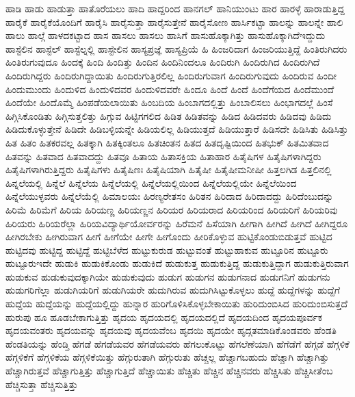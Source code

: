 {ಹಾಡಿ
ಹಾಡು
ಹಾಡುತ್ತಾ
ಹಾತೊರೆಯಲು
ಹಾದಿ
ಹಾದ್ದರಿಂದ
ಹಾನಗಲ್
ಹಾನಿಯುಂಟು
ಹಾರ
ಹಾರಳ್ಳೆ
ಹಾರಾಡುತ್ತಿದ್ದ
ಹಾರೈಕೆ
ಹಾರೈಕೆಯೊಂದಿಗೆ
ಹಾರೈಸಿ
ಹಾರೈಸುತ್ತಾ
ಹಾರೈಸುತ್ತೇನೆ
ಹಾರೈಸೋಣ
ಹಾರ್ಸಿಕಟ್ಟಾ
ಹಾಲನ್ನು
ಹಾಲನ್ನೇ
ಹಾಲಿ
ಹಾಲು
ಹಾಲ್ಗೆ
ಹಾಳದಕಟ್ಟಾದ
ಹಾಸ
ಹಾಸಲು
ಹಾಸಲು
ಹಾಸಿಗೆ
ಹಾಸುಹೊಕ್ಕಾಗಿತ್ತು
ಹಾಸುಹೊಕ್ಕಾಗಿದೆಇದ್ದುದು
ಹಾಸ್ಟೆಲಿನ
ಹಾಸ್ಟೆಲ್
ಹಾಸ್ಟೆಲ್ನಲ್ಲಿ
ಹಾಸ್ಟೇಲಿನ
ಹಾಸ್ಯಪ್ರಜ್ಞೆ
ಹಾಸ್ಯಪ್ರಿಯೆ
ಹಿ
ಹಿಂಜರಿದಾಗ
ಹಿಂಜರಿಯುತ್ತಿದ್ದೆ
ಹಿಂತಿರುಗಿದರು
ಹಿಂತಿರುಗುವುದೂ
ಹಿಂದಕ್ಕೆ
ಹಿಂದಿ
ಹಿಂದಿತ್ತು
ಹಿಂದಿನ
ಹಿಂದಿನಿಂದಲೂ
ಹಿಂದಿರುಗಿ
ಹಿಂದಿರುಗಿದ
ಹಿಂದಿರುಗಿದೆ
ಹಿಂದಿರುಗಿದ್ದರು
ಹಿಂದಿರುಗಿದ್ದಾಯಿತು
ಹಿಂದಿರುಗುತ್ತಿರಲಿಲ್ಲ
ಹಿಂದಿರುಗುವಾಗ
ಹಿಂದಿರುಗುವುದು
ಹಿಂದಿರುವ
ಹಿಂದೀ
ಹಿಂದುಮುಂದು
ಹಿಂದುಳಿದ
ಹಿಂದುಳಿದವರ
ಹಿಂದುಳಿದವರೇ
ಹಿಂದೂ
ಹಿಂದೆ
ಹಿಂದೆ
ಹಿಂದೆಗೆಯದ
ಹಿಂದೆಮುಂದೆ
ಹಿಂದೆಯೇ
ಹಿಂದೊಮ್ಮೆ
ಹಿಂಪಡೆಯಲಾಯಿತು
ಹಿಂಬದಿಯ
ಹಿಂಬಾಗದಲ್ಲಿತ್ತು
ಹಿಂಬಾಲಿಸಲು
ಹಿಂಭಾಗದಲ್ಲೆ
ಹಿಂಸೆ
ಹಿಗ್ಗಿಸಿಕೊಂಡಿತು
ಹಿಗ್ಗಿಸುತ್ತಲಿತ್ತು
ಹಿಗ್ಗುವ
ಹಿಟ್ಟಿಗಗಲಿದ
ಹಿಡಿತ
ಹಿಡಿತವನ್ನು
ಹಿಡಿದ
ಹಿಡಿದವರು
ಹಿಡಿದವು
ಹಿಡಿದು
ಹಿಡಿದುಕೊಳ್ಳುತ್ತೇನೆ
ಹಿಡಿದೇ
ಹಿಡಿಬಳ್ಳಿಯನ್ನೇ
ಹಿಡಿಯಲಿಲ್ಲ
ಹಿಡಿಯುತ್ತದೆ
ಹಿಡಿಯುತ್ತಾರೆ
ಹಿಡಿಸದೇ
ಹಿಡಿಸಿತು
ಹಿಡಿಸಿತ್ತು
ಹಿತ
ಹಿತಂ
ಹಿತಕರವಲ್ಲ
ಹಿತಕ್ಕಾಗಿ
ಹಿತಕ್ಕಿಂತಲೂ
ಹಿತಚಿಂತನ
ಹಿತದ
ಹಿತದೃಷ್ಟಿಯಿಂದ
ಹಿತಭುಕ್
ಹಿತಮಿತವಾದ
ಹಿತವನ್ನು
ಹಿತವಾದ
ಹಿತವಾದದ್ದು
ಹಿತವೂ
ಹಿತಾಯ
ಹಿತಾಸಕ್ತಿಯ
ಹಿತಾಹಾರ
ಹಿತೈಷಿಗಳ
ಹಿತೈಷಿಗಳಾಗಿದ್ದರು
ಹಿತೈಷಿಗಳಾಗಿರುತ್ತಿದ್ದರು
ಹಿತೈಷಿಗಳು
ಹಿತೈಷಿಣಃ
ಹಿತೈಷಿಯಾಗಿ
ಹಿತೈಷೀ
ಹಿತೈಷೀಮನೀಷೀ
ಹಿತ್ತಲಗಿಡ
ಹಿತ್ತಲಿನಲ್ಲಿ
ಹಿನ್ನಲೆಯಲ್ಲಿ
ಹಿನ್ನೆಲೆ
ಹಿನ್ನೆಲೆಯ
ಹಿನ್ನೆಲೆಯಲ್ಲಿ
ಹಿನ್ನೆಲೆಯಲ್ಲಿಯಿಂದ
ಹಿನ್ನೆಲೆಯಲ್ಲಿಯೇ
ಹಿನ್ನೆಲೆಯಿಂದ
ಹಿನ್ನೆಲೆಯುಳ್ಳವರು
ಹಿನ್ನೆಲೆಯೆಲ್ಲಿ
ಹಿಮಾಲಯಃ
ಹಿರಣ್ಯರೇತಸಂ
ಹಿರಿತನ
ಹಿರಿದಾದ
ಹಿರಿದಾದದ್ದು
ಹಿರಿದೆಂಬುದನ್ನು
ಹಿರಿಮೆ
ಹಿರಿಮೆಗೆ
ಹಿರಿಯ
ಹಿರಿಯಣ್ಣ
ಹಿರಿಯಣ್ಣನ
ಹಿರಿಯರ
ಹಿರಿಯರಾದ
ಹಿರಿಯರಿಂದ
ಹಿರಿಯರಿಗೆ
ಹಿರಿಯರಿವು
ಹಿರಿಯರು
ಹಿರಿಯರೆಲ್ಲಾ
ಹಿರಿಯವಿದ್ಯಾರ್ಥಿಯೋರ್ವರನ್ನು
ಹಿರೆಮನೆ
ಹಿಸೆಯಾಗಿ
ಹೀಗಾಗಿ
ಹೀಗಿದೆ
ಹೀಗಿದೆ
ಹೀಗಿದ್ದರೂ
ಹೀಗಿರಬೇಕು
ಹೀಗಿರುವಾಗ
ಹೀಗೆ
ಹೀಗೆಯೇ
ಹೀಗೇ
ಹೀಗೊಂದು
ಹೀರಿಕೊಳ್ಳುವ
ಹುಟ್ಟಿಕೊಂಡುಬಿಡುತ್ತವೆ
ಹುಟ್ಟಿದ
ಹುಟ್ಟಿದವು
ಹುಟ್ಟಿದ್ದ
ಹುಟ್ಟಿದ್ದೆ
ಹುಟ್ಟಿಬೆಳೆದ
ಹುಟ್ಟುಕುರುಡ
ಹುಟ್ಟುವಂತೆ
ಹುಟ್ಟುಹಾಕುವ
ಹುಟ್ಟೂರಿನ
ಹುಟ್ಟೂರು
ಹುಟ್ಟೂರುಇದೇ
ಹುಡುಕಿ
ಹುಡುಕಿಕೊಂಡು
ಹುಡುಕಿದೆ
ಹುಡುಕುತ್ತ
ಹುಡುಕುತ್ತಿದ್ದ
ಹುಡುಕುತ್ತಿದ್ದಾಗ
ಹುಡುಕುತ್ತಿರುವಾಗ
ಹುಡುಕುವ
ಹುಡುಕುವುದಕ್ಕಾಗಿಯೇ
ಹುಡುಕುವುದು
ಹುಡುಗ
ಹುಡುಗನ
ಹುಡುಗನಾದ
ಹುಡುಗನಿಗೆ
ಹುಡುಗನು
ಹುಡುಗರಿಗೆಲ್ಲಾ
ಹುಡುಗಿಯರಿಗೆ
ಹುಡುಗಿಯರೇ
ಹುದುಗಿರುವ
ಹುದುಗಿಸಿಟ್ಟುಕೊಳ್ಳಲು
ಹುದ್ದೆ
ಹುದ್ದೆಗಳನ್ನು
ಹುದ್ದೆಗೆ
ಹುದ್ದೆಯ
ಹುದ್ದೆಯನ್ನು
ಹುದ್ದೆಯಲ್ಲಿದ್ದು
ಹುನ್ನಾರ
ಹುರಿಗೊಳಿಸಿಕೊಳ್ಳಬೇಕಾಯಿತು
ಹುರಿದುಂಬಿಸಿದ
ಹುರಿದುಂಬಿಸುತ್ತದೆ
ಹುರುಪು
ಹೂ
ಹೂಡಬೇಕಾಗುತ್ತಿತ್ತು
ಹೃದಯ
ಹೃದಯದಲ್ಲಿ
ಹೃದಯದಲ್ಲಿದೆ
ಹೃದಯದಿಂದ
ಹೃದಯಪೂರ್ವಕ
ಹೃದಯವಂತರು
ಹೃದಯವನ್ನು
ಹೃದಯವು
ಹೃದಯವೆಂಬ
ಹೃದಯಿ
ಹೃದಯೇ
ಹೃದ್ಗತಮಾಡಿಕೊಂಡವರು
ಹೆಂಡತಿ
ಹೆಂಡತಿಯನ್ನು
ಹೆಂಡ್ತಿ
ಹೆಗಡೆ
ಹೆಗಡೆಯವರ
ಹೆಗಡೆಯವರು
ಹೆಗಲುಕೊಟ್ಟು
ಹೆಗಲೆಣೆಯಾಗಿ
ಹೆಗೆಡೆಗೆ
ಹೆಗ್ಗಡೆ
ಹೆಗ್ಗಳಿಕೆ
ಹೆಗ್ಗಳಿಕೆಗೆ
ಹೆಗ್ಗಳಿಕೆಯ
ಹೆಗ್ಗಳಿಕೆಯಿತ್ತು
ಹೆಗ್ಗುರುತಾಗಿ
ಹೆಗ್ಗುರುತು
ಹೆಚ್ಚಲ್ಲ
ಹೆಚ್ಚಾಗಬಹುದು
ಹೆಚ್ಚಾಗಿ
ಹೆಚ್ಚಾಗಿತ್ತು
ಹೆಚ್ಚಾಗಿರುತ್ತವೆ
ಹೆಚ್ಚಾಗುತ್ತಿತ್ತು
ಹೆಚ್ಚಾಗುತ್ತಿದೆ
ಹೆಚ್ಚಾಯಿತು
ಹೆಚ್ಚಿತು
ಹೆಚ್ಚಿನ
ಹೆಚ್ಚಿನವರು
ಹೆಚ್ಚಿಸಿತು
ಹೆಚ್ಚಿಸೀತೆಂಬ
ಹೆಚ್ಚಿಸುತ್ತಾ
ಹೆಚ್ಚಿಸುತ್ತಿತ್ತು
}
